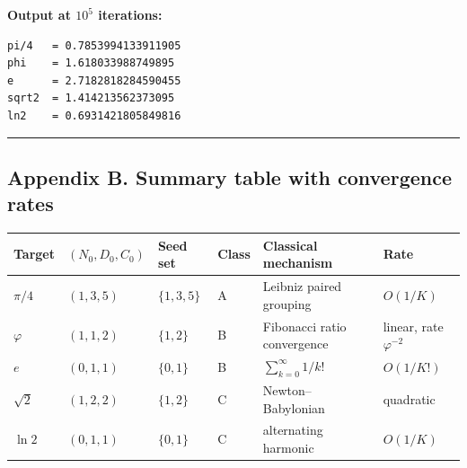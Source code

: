 \documentclass[
  11pt,
  letterpaper,
]{article}
\begin{document}
\textbf{Output at \(10^5\) iterations:}

\begin{verbatim}
pi/4   = 0.7853994133911905
phi    = 1.618033988749895
e      = 2.7182818284590455
sqrt2  = 1.414213562373095
ln2    = 0.6931421805849816
\end{verbatim}

\begin{center}\rule{0.5\linewidth}{0.5pt}\end{center}

\subsection{Appendix B. Summary table with convergence
rates}\label{appendix-b.-summary-table-with-convergence-rates}

\begin{longtable}[]{@{}
  >{\raggedright\arraybackslash}p{}
  >{\raggedright\arraybackslash}p{}
  >{\raggedright\arraybackslash}p{}
  >{\raggedright\arraybackslash}p{}
  >{\raggedright\arraybackslash}p{}
  >{\raggedright\arraybackslash}p{}@{}}
\toprule\noalign{}
\begin{minipage}[b]{\linewidth}\raggedright
Target
\end{minipage} & \begin{minipage}[b]{\linewidth}\raggedright
\((N_0,D_0,C_0)\)
\end{minipage} & \begin{minipage}[b]{\linewidth}\raggedright
Seed set
\end{minipage} & \begin{minipage}[b]{\linewidth}\raggedright
Class
\end{minipage} & \begin{minipage}[b]{\linewidth}\raggedright
Classical mechanism
\end{minipage} & \begin{minipage}[b]{\linewidth}\raggedright
Rate
\end{minipage} \\
\midrule\noalign{}
\endhead
\bottomrule\noalign{}
\endlastfoot
\(\pi/4\) & \((1,3,5)\) & \(\{1,3,5\}\) & A & Leibniz paired grouping &
\(O(1/K)\) \\
\(\varphi\) & \((1,1,2)\) & \(\{1,2\}\) & B & Fibonacci ratio
convergence & linear, rate \(\varphi^{-2}\) \\
\(e\) & \((0,1,1)\) & \(\{0,1\}\) & B & \(\sum_{k=0}^\infty 1/k!\) &
\(O(1/K!)\) \\
\(\sqrt{2}\) & \((1,2,2)\) & \(\{1,2\}\) & C & Newton--Babylonian &
quadratic \\
\(\ln 2\) & \((0,1,1)\) & \(\{0,1\}\) & C & alternating harmonic &
\(O(1/K)\) \\
\end{longtable}
\end{document}
